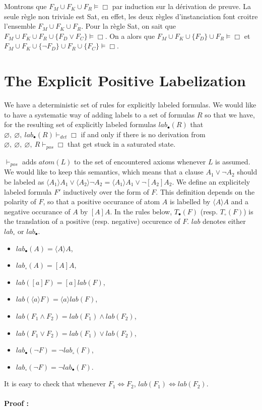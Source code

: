 \documentclass[a4paper,11pt]{article}
\newcommand{\atom}{\mathit{atom}}
\newcommand{\pos}{\vdash_\mathit{pos}}
\newcommand{\dett}{\vdash_\mathit{det}}
\newcommand{\T}{\mathit{lab}}
\begin{document}
Montrons que $F_M\cup F_K\cup F_R\vDash\Box$ par induction sur la dérivation de preuve.
La seule règle non triviale est {\sc Sat}, en effet, les deux règles d'instanciation font croitre
l'ensemble $F_M\cup F_K\cup F_R$. Pour la règle {\sc Sat}, on sait que
$F_M\cup F_K\cup F_R\cup\{F_D\vee F_C\}\vDash\Box$. On a alors que
$F_M\cup F_K\cup\{F_D\}\cup F_R\vDash\Box$ et $F_M\cup F_K\cup\{\neg F_D\}\cup F_R\cup\{F_C\}\vDash\Box$.

\section{The Explicit Positive Labelization}
We have a deterministic set of rules for explicitly labeled formulas. We would like to have a 
systematic way of adding labels to a set of formulas $R$ so that we have, for the resulting set of
explicitly labeled formulas $\T_\bullet(R)$ that
$\varnothing,\ \varnothing,\ \T_\bullet(R)\dett\Box$ if and only if
there is no derivation from $\varnothing,\ \varnothing,\ \varnothing,\ R\pos\Box$ that get stuck
in a saturated state.

$\pos$ adds $\atom(L)$ to the set of encountered axioms whenever $L$ is assumed. We would like to
keep this semantics, which means that a clause $A_1\vee\neg A_2$ should be labeled as
$\langle A_1\rangle A_1\vee\langle A_2\rangle\neg A_2=\langle A_1\rangle A_1\vee\neg [A_2]A_2$.
We define an explicitely labeled formula $F'$ inductively over the form of $F$. This definition
depends on the polarity of $F$, so that a positive occurance of atom $A$ is labelled by
$\langle A\rangle A$ and a negative occurance of $A$ by $[A]A$. In the rules below,
$T_\bullet(F)$ (resp. $T_\circ(F)$) is the translation of a positive (resp.
negative) occurence of $F$. $\T$ denotes either $\T_\circ$ or $\T_\bullet$.
\begin{itemize}
 \item $\T_\bullet(A)=\langle A\rangle A$,
 \item $\T_\circ(A)=[A]A$,
 \item $\T([a]F)=[a]\T(F)$,
 \item $\T(\langle a\rangle F)=\langle a\rangle\T(F)$,
 \item $\T(F_1\wedge F_2)=\T(F_1)\wedge\T(F_2)$,
 \item $\T(F_1\vee F_2)=\T(F_1)\vee\T(F_2)$,
 \item $\T_\bullet(\neg F)= \neg\T_\circ(F)$,
 \item $\T_\circ(\neg F)= \neg\T_\bullet(F)$.
\end{itemize}
It is easy to check that whenever $F_1\Leftrightarrow F_2$, $\T(F_1)\Leftrightarrow \T(F_2)$.

\paragraph{Proof :}
\end{document}
